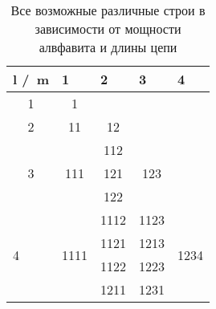\begin{table}[all_orders]
  \centering
  \caption{Все возможные различные строи в зависимости от мощности алвфавита и длины цепи}
  \label{my-label}
  \begin{tabular}{@{}|l|l|lll@{}}
     \hline
     l /\ m                                   & 1                                         & \multicolumn{1}{l|}{2}   & \multicolumn{1}{l|}{3}                    & \multicolumn{1}{l|}{4}                     \\ \midrule
     \multicolumn{1}{|c|}{1}                  & \multicolumn{1}{c|}{1}                    & \multicolumn{1}{c}{}     & \multicolumn{1}{c}{}                      & \multicolumn{1}{c}{}                       \\ \cmidrule(r){1-3}
     \multicolumn{1}{|c|}{2}                  & \multicolumn{1}{c|}{11}                   & \multicolumn{1}{c|}{12}  & \multicolumn{1}{c}{}                      & \multicolumn{1}{c}{}                       \\ \cmidrule(r){1-4}
     \multicolumn{1}{|c|}{\multirow{3}{*}{3}} & \multicolumn{1}{c|}{\multirow{3}{*}{111}} & \multicolumn{1}{c|}{112} & \multicolumn{1}{c|}{\multirow{3}{*}{123}} & \multicolumn{1}{c}{\multirow{3}{*}{}}      \\
     \multicolumn{1}{|c|}{}                   & \multicolumn{1}{c|}{}                     & \multicolumn{1}{c|}{121} & \multicolumn{1}{c|}{}                     & \multicolumn{1}{c}{}                       \\
     \multicolumn{1}{|c|}{}                   & \multicolumn{1}{c|}{}                     & \multicolumn{1}{c|}{122} & \multicolumn{1}{c|}{}                     & \multicolumn{1}{c}{}                       \\ \cmidrule(r){1-5} 
     \multirow{7}{*}{4}                       & \multirow{7}{*}{1111}                     & 1112                     & \multicolumn{1}{|l|}{1123}                 & \multicolumn{1}{l|}{\multirow{7}{*}{1234}} \\
                                              &                                           & 1121                     & \multicolumn{1}{|l|}{1213}                 & \multicolumn{1}{l|}{}                      \\
                                              &                                           & 1122                     & \multicolumn{1}{|l|}{1223}                 & \multicolumn{1}{l|}{}                      \\
                                              &                                           & 1211                     & \multicolumn{1}{|l|}{1231}                 & \multicolumn{1}{l|}{}                      \\

\end{tabular}
\end{table}
